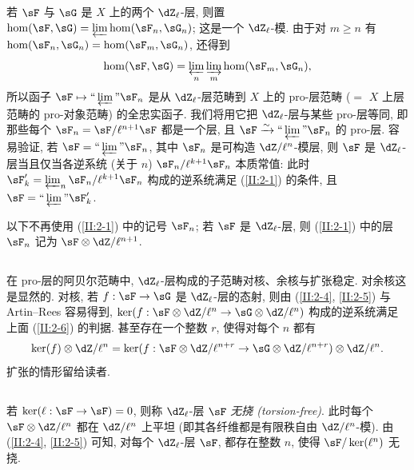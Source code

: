 若 $\sF$ 与 $\sG$ 是 $X$ 上的两个 $\dZ_\ell$-层, 则置 $\hom(\sF,\sG) = \varprojlim\hom(\sF_n,\sG_n)$; 这是一个 $\dZ_\ell$-模. 由于对 $m\geqslant n$ 有 $\hom(\sF_n,\sG_n) = \hom(\sF_m,\sG_n)$, 还得到
\[
  \hom(\sF,\sG) = \varprojlim_n \varinjlim_m \hom(\sF_m,\sG_n) \text{,}
\]
所以函子 $\sF\mapsto \text{``}\varprojlim\text{''}\sF_n$ 是从 $\dZ_\ell$-层范畴到 $X$ 上的 pro-层范畴 ($=$ $X$ 上层范畴的 pro-对象范畴) 的全忠实函子. 我们将用它把 $\dZ_\ell$-层与某些 pro-层等同, 即那些每个 $\sF_n=\sF/\ell^{n+1}\sF$ 都是一个层, 且 $\sF\iso \text{``}\varprojlim\text{''}\sF_n$ 的 pro-层. 容易验证, 若 $\sF=\text{``}\varprojlim\text{''}\sF_n$, 其中 $\sF_n$ 是可构造 $\dZ/\ell^n$-模层, 则 $\sF$ 是 $\dZ_\ell$-层当且仅当各逆系统 (关于 $n$) $\sF_n/\ell^{k+1}\sF_n$ 本质常值: 此时 $\sF_k'=\varprojlim_n\sF_n/\ell^{k+1}\sF_n$ 构成的逆系统满足 (\ref{II:2-1}) 的条件, 且 $\sF=\text{``}\varprojlim\text{''}\sF_k'$.

以下不再使用 (\ref{II:2-1}) 中的记号 $\sF_n$; 若 $\sF$ 是 $\dZ_\ell$-层, 则 (\ref{II:2-1}) 中的层 $\sF_n$ 记为 $\sF\otimes\dZ/\ell^{n+1}$.

\subsection{}\label{II:2-7}

在 pro-层的阿贝尔范畴中, $\dZ_\ell$-层构成的子范畴对核、余核与扩张稳定. 对余核这是显然的. 对核, 若 $f:\sF\to\sG$ 是 $\dZ_\ell$-层的态射, 则由 (\ref{II:2-4}, \ref{II:2-5}) 与 Artin--Rees 容易得到, $\ker(f:\sF\otimes\dZ/\ell^n\to\sG\otimes\dZ/\ell^n)$ 构成的逆系统满足上面 (\ref{II:2-6}) 的判据. 甚至存在一个整数 $r$, 使得对每个 $n$ 都有
\[
  \ker(f)\otimes\dZ/\ell^n = \ker(f:\sF\otimes\dZ/\ell^{n+r}\to\sG\otimes\dZ/\ell^{n+r})\otimes\dZ/\ell^n \text{.}
\]
扩张的情形留给读者.

\subsection{}\label{II:2-8}

若 $\ker(\ell:\sF\to\sF) = 0$, 则称 $\dZ_\ell$-层 $\sF$ \emph{无挠 (torsion-free)}. 此时每个 $\sF\otimes\dZ/\ell^n$ 都在 $\dZ/\ell^n$ 上平坦 (即其各纤维都是有限秩自由 $\dZ/\ell^n$-模). 由 (\ref{II:2-4}, \ref{II:2-5}) 可知, 对每个 $\dZ_\ell$-层 $\sF$, 都存在整数 $n$, 使得 $\sF/\ker(\ell^n)$ 无挠.

\subsection{}\label{II:2-9}


